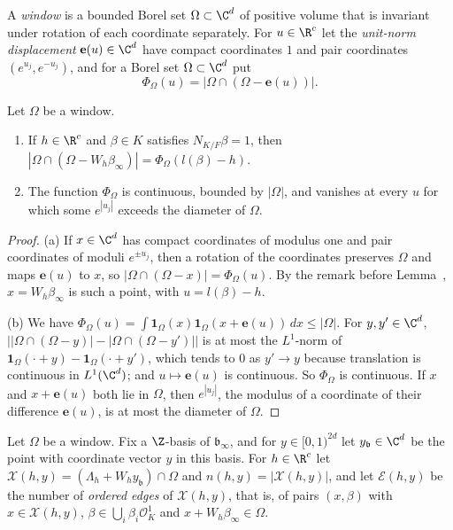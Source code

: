 \begin{definition}\label{geo:window}
A \emph{window} is a bounded Borel set $\Omega\subset\C^d$ of positive
volume that is invariant under rotation of each coordinate separately.
For $u\in\R^c$ let the \emph{unit-norm displacement} $\mathbf e(u)\in\C^d$
have compact coordinates $1$ and pair coordinates $(e^{u_j},e^{-u_j})$, and
for a Borel set $\Omega\subset\C^d$ put
\[
 \Phi_\Omega(u)=|\Omega\cap(\Omega-\mathbf e(u))|.
\]
\end{definition}

\begin{lemma}\label{geo:phi-omega}
Let $\Omega$ be a window.
\begin{enumerate}
\item[(a)] If $h\in\R^c$ and $\beta\in K$ satisfies $N_{K/F}\beta=1$, then
 $|\Omega\cap(\Omega-W_h\beta_\infty)|=\Phi_\Omega(l(\beta)-h)$.
\item[(b)] The function $\Phi_\Omega$ is continuous, bounded by $|\Omega|$,
 and vanishes at every $u$ for which some $e^{|u_j|}$ exceeds the diameter of
 $\Omega$.
\end{enumerate}
\end{lemma}

\begin{proof}
(a) If $x\in\C^d$ has compact coordinates of modulus one and pair
coordinates of moduli $e^{\pm u_j}$, then a rotation of the coordinates
preserves $\Omega$ and maps $\mathbf e(u)$ to $x$, so
$|\Omega\cap(\Omega-x)|=\Phi_\Omega(u)$. By the remark before
Lemma~, $x=W_h\beta_\infty$ is such a point, with
$u=l(\beta)-h$.

(b) We have $\Phi_\Omega(u)=\int\mathbf 1_\Omega(x)\mathbf
1_\Omega(x+\mathbf e(u))\,dx\le|\Omega|$. For $y,y'\in\C^d$,
$\bigl||\Omega\cap(\Omega-y)|-|\Omega\cap(\Omega-y')|\bigr|$ is at most the
$L^1$-norm of $\mathbf 1_\Omega(\cdot+y)-\mathbf 1_\Omega(\cdot+y')$, which
tends to $0$ as $y'\to y$ because translation is continuous in $L^1(\C^d)$;
and $u\mapsto\mathbf e(u)$ is continuous. So $\Phi_\Omega$ is continuous. If
$x$ and $x+\mathbf e(u)$ both lie in $\Omega$, then $e^{|u_j|}$, the modulus
of a coordinate of their difference $\mathbf e(u)$, is at most the diameter of
$\Omega$.
\end{proof}

\begin{definition}\label{geo:counts}
Let $\Omega$ be a window. Fix a $\Z$-basis of $\mathfrak b_\infty$, and for
$y\in[0,1)^{2d}$ let $y_{\mathfrak b}\in\C^d$ be the point with coordinate
vector $y$ in this basis. For $h\in\R^c$ let
$\mathcal X(h,y)=(\Lambda_h+W_hy_{\mathfrak b})\cap\Omega$ and
$n(h,y)=|\mathcal X(h,y)|$, and let $\mathcal E(h,y)$ be the number of
\emph{ordered edges} of $\mathcal X(h,y)$, that is, of pairs $(x,\beta)$
with $x\in\mathcal X(h,y)$, $\beta\in\bigcup_i\beta_i\mathcal O_K^1$ and
$x+W_h\beta_\infty\in\Omega$.
\end{definition}

